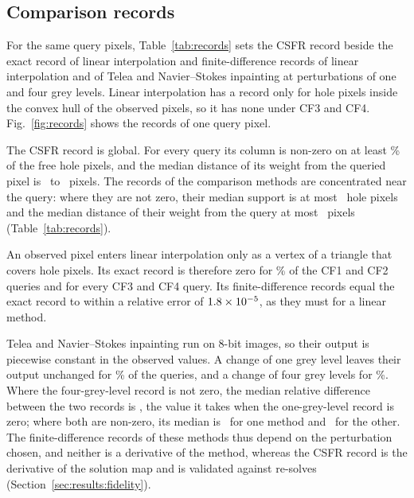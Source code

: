 \documentclass[final,3p]{elsarticle}
\begin{document}
\subsection{Comparison records}
\label{sec:results:records}

For the same query pixels, Table~\ref{tab:records} sets the CSFR record beside the exact record of linear interpolation and finite-difference records of linear interpolation and of Telea and Navier--Stokes inpainting at perturbations of one and four grey levels. Linear interpolation has a record only for hole pixels inside the convex hull of the observed pixels, so it has none under CF3 and CF4. Fig.~\ref{fig:records} shows the records of one query pixel.

The CSFR record is global. For every query its column is non-zero on at least \recCsfrSupportMinShare\% of the free hole pixels, and the median distance of its weight from the queried pixel is \recCsfrReachMin\ to \recCsfrReachMax\ pixels. The records of the comparison methods are concentrated near the query: where they are not zero, their median support is at most \recCmpSupportMax\ hole pixels and the median distance of their weight from the query at most \recCmpReachMax\ pixels (Table~\ref{tab:records}).

An observed pixel enters linear interpolation only as a vertex of a triangle that covers hole pixels. Its exact record is therefore zero for \recLinZeroScatter\% of the CF1 and CF2 queries and for every CF3 and CF4 query. Its finite-difference records equal the exact record to within a relative error of $1.8\times 10^{-5}$, as they must for a linear method.

Telea and Navier--Stokes inpainting run on 8-bit images, so their output is piecewise constant in the observed values. A change of one grey level leaves their output unchanged for \recPdeZeroOne\% of the queries, and a change of four grey levels for \recPdeZeroFour\%. Where the four-grey-level record is not zero, the median relative difference between the two records is \recPdeFdDiffMed, the value it takes when the one-grey-level record is zero; where both are non-zero, its median is \recPdeFdDiffBothMin\ for one method and \recPdeFdDiffBothMax\ for the other. The finite-difference records of these methods thus depend on the perturbation chosen, and neither is a derivative of the method, whereas the CSFR record is the derivative of the solution map and is validated against re-solves (Section~\ref{sec:results:fidelity}).
\end{document}
